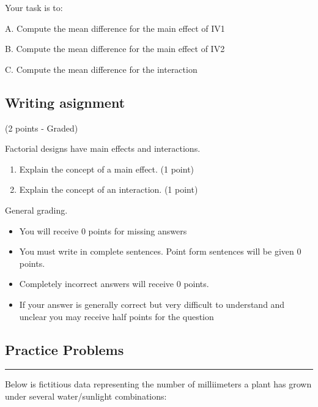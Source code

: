 \documentclass[
]{book}
\providecommand{\tightlist}{%
  \setlength{\itemsep}{0pt}\setlength{\parskip}{0pt}}
\begin{document}
Your task is to:

A. Compute the mean difference for the main effect of IV1

B. Compute the mean difference for the main effect of IV2

C. Compute the mean difference for the interaction

\hypertarget{writing-asignment}{%
\subsection{Writing asignment}\label{writing-asignment}}

(2 points - Graded)

Factorial designs have main effects and interactions.

\begin{enumerate}
\def\labelenumi{\arabic{enumi}.}
\item
  Explain the concept of a main effect. (1 point)
\item
  Explain the concept of an interaction. (1 point)
\end{enumerate}

General grading.

\begin{itemize}
\tightlist
\item
  You will receive 0 points for missing answers
\item
  You must write in complete sentences. Point form sentences will be
  given 0 points.
\item
  Completely incorrect answers will receive 0 points.
\item
  If your answer is generally correct but very difficult to understand
  and unclear you may receive half points for the question
\end{itemize}

\hypertarget{practice-problems-8}{%
\subsection{Practice Problems}\label{practice-problems-8}}

\begin{center}\rule{0.5\linewidth}{0.5pt}\end{center}

Below is fictitious data representing the number of milliimeters a plant
has grown under several water/sunlight combinations:
\end{document}
